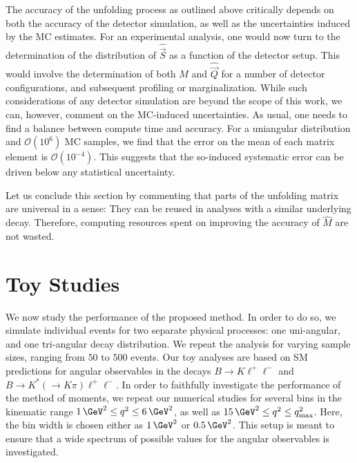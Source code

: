 \documentclass[aps,nofootinbib,preprintnumbers,prd,twocolumn]{revtex4-1}
\newcommand{\est}[1]{\widehat{#1}}
\newcommand{\order}[1]{\mathcal{O}\left({#1}\right)}
\newcommand{\vecest}[1]{\widehat{\vec{#1}}}
\begin{document}
The accuracy of the unfolding process as outlined above critically depends on
both the accuracy of the detector simulation, as well as the uncertainties
induced by the MC estimates.  For an experimental analysis, one would now turn
to the determination of the distribution of $\vecest{S}$ as a function of the
detector setup. This would involve the determination of both $M$ and
$\vecest{Q}$ for a number of detector configurations, and subsequent profiling
or marginalization.  While such considerations of any detector simulation are
beyond the scope of this work, we can, however, comment on the MC-induced
uncertainties. As usual, one needs to find a balance between compute time and
accuracy. For a uniangular distribution and $\order{10^6}$ MC samples, we find
that the error on the mean of each matrix element is $\order{10^{-4}}$.
This suggests that the so-induced systematic error can be driven below any
statistical uncertainty.

Let us conclude this section by commenting that parts of the unfolding matrix
are universal in a sense: They can be reused in analyses with a
similar underlying decay.  Therefore, computing resources spent on improving
the accuracy of $\est{M}$ are not wasted.


\section{Toy Studies}
\label{sec:numerics}

We now study the performance of the proposed method. In order to do so, we simulate
individual events for two separate physical processes: one uni-angular, and one tri-angular decay
distribution. We repeat the analysis for varying sample sizes, ranging from
$50$ to $500$ events. Our toy analyses are based on SM predictions for angular observables
in the decays $B\to K\ell^+\ell^-$ and $B\to K^*(\to K\pi)\ell^+\ell^-$.
In order to faithfully investigate the performance of the method of moments, we repeat our
numerical studies for several bins in the kinematic range $1\,\GeV^2 \leq q^2 \leq 6\,\GeV^2$,
as well as $15\,\GeV^2 \leq q^2 \leq q^2_\text{max}$. Here, the bin width is chosen either
as $1\,\GeV^2$ or $0.5\,\GeV^2$. This setup is meant to ensure that a wide spectrum of possible
values for the angular observables is investigated.\\
\end{document}
